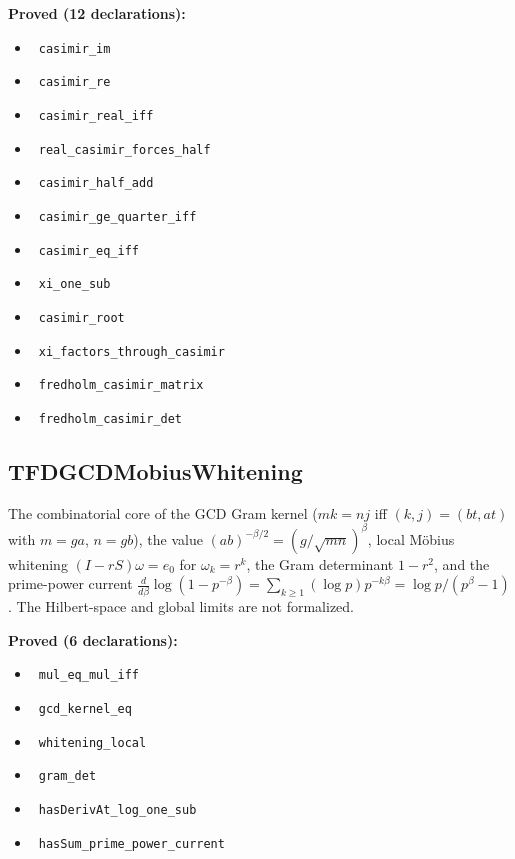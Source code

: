\documentclass{report}
\theoremstyle{definition}
\begin{document}
\noindent\textbf{Proved (12 declarations):}
\begin{itemize}
  \item {}\leanok\ \texttt{casimir\_im}
  \item {}\leanok\ \texttt{casimir\_re}
  \item {}\leanok\ \texttt{casimir\_real\_iff}
  \item {}\leanok\ \texttt{real\_casimir\_forces\_half}
  \item {}\leanok\ \texttt{casimir\_half\_add}
  \item {}\leanok\ \texttt{casimir\_ge\_quarter\_iff}
  \item {}\leanok\ \texttt{casimir\_eq\_iff}
  \item {}\leanok\ \texttt{xi\_one\_sub}
  \item {}\leanok\ \texttt{casimir\_root}
  \item {}\leanok\ \texttt{xi\_factors\_through\_casimir}
  \item {}\leanok\ \texttt{fredholm\_casimir\_matrix}
  \item {}\leanok\ \texttt{fredholm\_casimir\_det}
\end{itemize}

\subsection{TFDGCDMobiusWhitening}
The combinatorial core of the GCD Gram kernel ($mk=nj$ iff $(k,j)=(bt,at)$ with $m=ga$, $n=gb$), the value $(ab)^{-\beta/2}=(g/\sqrt{mn})^\beta$, local M\"obius whitening $(I-rS)\omega=e_0$ for $\omega_k=r^k$, the Gram determinant $1-r^2$, and the prime-power current $\frac{d}{d\beta}\log(1-p^{-\beta})=\sum_{k\ge1}(\log p)p^{-k\beta}=\log p/(p^\beta-1)$. The Hilbert-space and global limits are not formalized.

\noindent\textbf{Proved (6 declarations):}
\begin{itemize}
  \item {}\leanok\ \texttt{mul\_eq\_mul\_iff}
  \item {}\leanok\ \texttt{gcd\_kernel\_eq}
  \item {}\leanok\ \texttt{whitening\_local}
  \item {}\leanok\ \texttt{gram\_det}
  \item {}\leanok\ \texttt{hasDerivAt\_log\_one\_sub}
  \item {}\leanok\ \texttt{hasSum\_prime\_power\_current}
\end{itemize}
\end{document}
